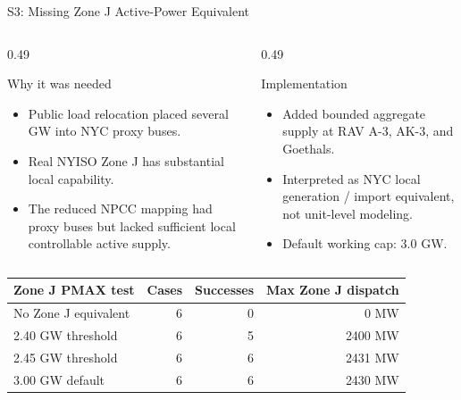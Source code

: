 \documentclass[aspectratio=169,10pt]{beamer}
\begin{document}
\begin{frame}{S3: Missing Zone J Active-Power Equivalent}
\begin{columns}[T,onlytextwidth]
\begin{column}{0.49\linewidth}
\begin{block}{Why it was needed}
\begin{itemize}
  \item Public load relocation placed several GW into NYC proxy buses.
  \item Real NYISO Zone J has substantial local capability.
  \item The reduced NPCC mapping had proxy buses but lacked sufficient local controllable active supply.
\end{itemize}
\end{block}
\end{column}
\begin{column}{0.49\linewidth}
\begin{block}{Implementation}
\begin{itemize}
  \item Added bounded aggregate supply at RAV A-3, AK-3, and Goethals.
  \item Interpreted as NYC local generation / import equivalent, not unit-level modeling.
  \item Default working cap: 3.0 GW.
\end{itemize}
\end{block}
\end{column}
\end{columns}

\vspace{0.7em}
\scriptsize
\begin{tabularx}{\linewidth}{X r r r}
\toprule
\textbf{Zone J PMAX test} & \textbf{Cases} & \textbf{Successes} & \textbf{Max Zone J dispatch} \\
\midrule
No Zone J equivalent & 6 & 0 & 0 MW \\
2.40 GW threshold & 6 & 5 & 2400 MW \\
2.45 GW threshold & 6 & 6 & 2431 MW \\
3.00 GW default & 6 & 6 & 2430 MW \\
\bottomrule
\end{tabularx}
\end{frame}
\end{document}
